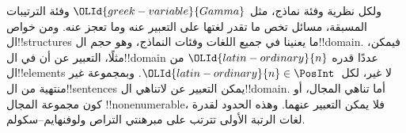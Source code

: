 \documentclass[../../../include/open-logic-section]{subfiles}
\begin{document}
ولكل نظرية وفئة نماذج، مثل $\OLId{greek-variable}{Gamma}$ وفئة الترتيبات المسبقة،
مسائل تخص ما تقدر لغتها على التعبير عنه وما تعجز عنه.
ومن خواص ال!!{structure}s ما يعنينا في جميع اللغات وفئات
النماذج، وهو حجم ال!!{domain}. فيمكن، مثلًا، التعبير عن
أن في ال!!{domain} عددًا قدره $\OLId{latin-ordinary}{n}$ من ال!!{element}s
لا غير، لكل~$\OLId{latin-ordinary}{n} \in \PosInt$. وبمجموعة غير منتهية من
ال!!{sentence}s يمكن التعبير عن لاتناهي ال!!{domain}.
أما تناهي المجال، أو كون مجموعة المجال !!{nonenumerable}،
فلا يمكن التعبير عنهما. وهذه الحدود لقدرة لغات الرتبة الأولى
تترتب على مبرهنتي التراص ولوفنهايم--سكولم.
\end{document}
